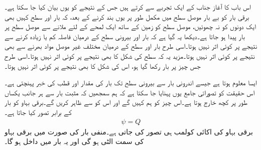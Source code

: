 
اس باب کا آغاز جناب  کے ایک تجربے سے کرتے ہیں جس کے نتیجے کو یوں بیان کیا جا سکتا ہے۔برقی بار  کو بے بار موصل سطح میں مکمل طور پر یوں بند کرنے کے بعد، کہ بار اور سطح  کہیں بھی ایک دونوں کو نہ چھوئیں، موصل سطح کو زمین کے ساتھ ایک لمحے کے لئے ملانے سے موصل سطح پر  بار پیدا ہو جاتا ہے۔دیکھا یہ گیا ہے کہ بار اور بیرونی سطح کے درمیان فاصلہ کم یا زیادہ کرنے سے نتیجے پر کوئی اثر نہیں ہوتا۔اسی طرح بار اور سطح کے درمیان مختلف غیر موصل مواد بھرنے سے بھی نتیجے پر کوئی اثر نہیں ہوتا۔مزید یہ کہ سطح کی شکل کا بھی نتیجے پر کوئی اثر نہیں ہوتا۔اسی طرح جس چیز پر بار  رکھا گیا ہو، اس کی شکل کا بھی نتیجے پر کوئی اثر نہیں ہوتا۔ 

ایسا معلوم ہوتا ہے جیسے اندرونی بار سے بیرونی سطح تک بار کی مقدار اور قطب کی خبر پہنچتی ہے۔اس حقیقت کو تصوراتی جامع یوں پہنایا جا سکتا ہے کہ ہم سمجھیں کہ مثبت بار سے ہر جانب یکساں طور پر کچھ خارج ہوتا ہے۔اس چیز کو ہم   کہیں گے اور اس کو  سے ظاہر کریں گے۔برقی بہاو کو بار کے برابر تصور کیا جاتا ہے۔
\begin{align}
\psi=Q
\end{align}
برقی بہاو کی اکائی  کولمب  ہی تصور کی جاتی ہے۔منفی بار کی صورت میں برقی بہاو کی سمت الٹی ہو گی اور یہ بار میں داخل ہو گا۔

